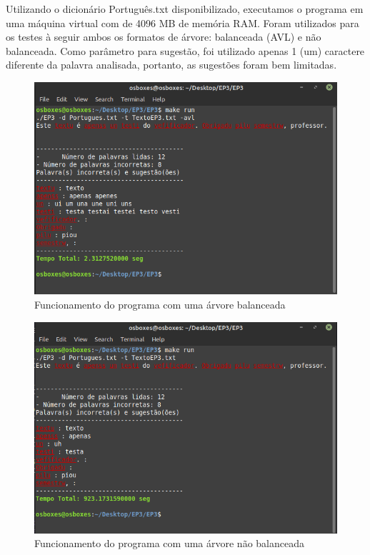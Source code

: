 \documentclass[12pt]{article}
\begin{document}
	Utilizando o dicionário Português.txt disponibilizado, executamos o programa em uma máquina virtual com de 4096 MB de memória RAM. Foram utilizados para os testes à seguir ambos os formatos de árvore: balanceada (AVL) e não balanceada. Como parâmetro para sugestão, foi utilizado apenas 1 (um) caractere diferente da palavra analisada, portanto, as sugestões foram bem limitadas.
	
	\begin{center}
		\begin{figure}[!h]
			\includegraphics[scale = 0.9]{teste1.png}
			\caption{Funcionamento do programa com uma árvore balanceada}
		\end{figure}
	\end{center}
	
	\begin{center}
		\begin{figure}[!h]
			\includegraphics[scale = 0.9]{teste2.png}
			\caption{Funcionamento do programa com uma árvore não balanceada}
		\end{figure}
	\end{center}
	
\end{document}
